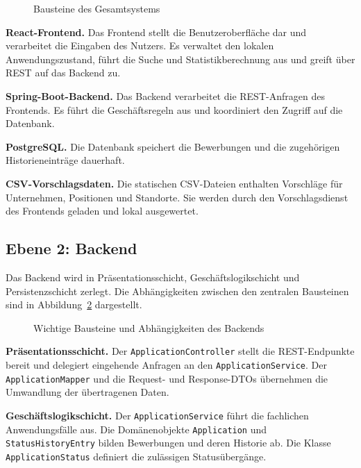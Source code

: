 \documentclass[a4paper,11pt]{article}
\begin{document}
\vspace{0.5cm}
\begin{figure}[H]
\centering

\caption{Bausteine des Gesamtsystems}
\label{fig:system-building-blocks}
\end{figure}

\textbf{React-Frontend.}
Das Frontend stellt die Benutzeroberfläche dar und verarbeitet die Eingaben des Nutzers.
Es verwaltet den lokalen Anwendungszustand, führt die Suche und Statistikberechnung aus und greift über REST auf das Backend zu.

\textbf{Spring-Boot-Backend.}
Das Backend verarbeitet die REST-Anfragen des Frontends.
Es führt die Geschäftsregeln aus und koordiniert den Zugriff auf die Datenbank.

\textbf{PostgreSQL.}
Die Datenbank speichert die Bewerbungen und die zugehörigen Historieneinträge dauerhaft.

\textbf{CSV-Vorschlagsdaten.}
Die statischen CSV-Dateien enthalten Vorschläge für Unternehmen, Positionen und Standorte.
Sie werden durch den Vorschlagsdienst des Frontends geladen und lokal ausgewertet.


\newpage
\subsection{Ebene 2: Backend}

Das Backend wird in Präsentationsschicht, Geschäftslogikschicht und Persistenzschicht zerlegt.
Die Abhängigkeiten zwischen den zentralen Bausteinen sind in Abbildung~\ref{fig:backend-building-blocks} dargestellt.

\vspace{0.5cm}
\begin{figure}[H]
\centering

\caption{Wichtige Bausteine und Abhängigkeiten des Backends}
\label{fig:backend-building-blocks}
\end{figure}

\textbf{Präsentationsschicht.}
Der \texttt{ApplicationController} stellt die REST-Endpunkte bereit und delegiert eingehende Anfragen an den \texttt{ApplicationService}.
Der \texttt{ApplicationMapper} und die Request- und Response-DTOs übernehmen die Umwandlung der übertragenen Daten.

\textbf{Geschäftslogikschicht.}
Der \texttt{ApplicationService} führt die fachlichen Anwendungsfälle aus.
Die Domänenobjekte \texttt{Application} und \texttt{StatusHistoryEntry} bilden Bewerbungen und deren Historie ab.
Die Klasse \texttt{ApplicationStatus} definiert die zulässigen Statusübergänge.
\end{document}
